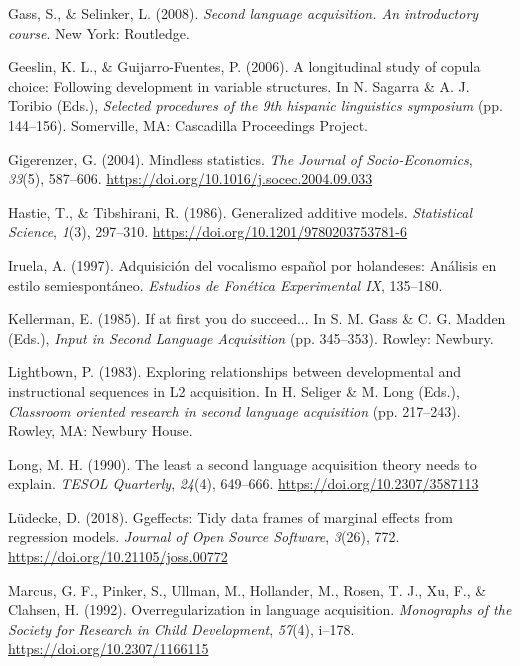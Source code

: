 \documentclass[
  letterpaper,
  DIV=11,
  numbers=noendperiod]{scrartcl}
\newlength{\cslhangindent}
\newenvironment{CSLReferences}[2] %
 {\begin{list}{}{%
  \setlength{\itemindent}{0pt}
  \setlength{\leftmargin}{0pt}
  \setlength{\parsep}{0pt}
  \ifodd #1
   \setlength{\leftmargin}{\cslhangindent}
   \setlength{\itemindent}{-1\cslhangindent}
  \fi
  \setlength{\itemsep}{#2\baselineskip}}}
 {\end{list}}
\begin{document}
\begin{CSLReferences}{1}{0}
Gass, S., \& Selinker, L. (2008). \emph{Second language acquisition. An
introductory course}. New York: Routledge.

Geeslin, K. L., \& Guijarro-Fuentes, P. (2006). A longitudinal study of
copula choice: Following development in variable structures. In N.
Sagarra \& A. J. Toribio (Eds.), \emph{Selected procedures of the 9th
hispanic linguistics symposium} (pp. 144--156). Somerville, MA:
Cascadilla Proceedings Project.

Gigerenzer, G. (2004). Mindless statistics. \emph{The Journal of
Socio-Economics}, \emph{33}(5), 587--606.
\url{https://doi.org/10.1016/j.socec.2004.09.033}

Hastie, T., \& Tibshirani, R. (1986). Generalized additive models.
\emph{Statistical Science}, \emph{1}(3), 297--310.
\url{https://doi.org/10.1201/9780203753781-6}

Iruela, A. (1997). Adquisici{ó}n del vocalismo espa{ñ}ol por holandeses:
An{á}lisis en estilo semiespont{á}neo. \emph{Estudios de Fon{é}tica
Experimental IX}, 135--180.

Kellerman, E. (1985). If at first you do succeed... In S. M. Gass \& C.
G. Madden (Eds.), \emph{Input in {Second Language Acquisition}} (pp.
345--353). Rowley: Newbury.

Lightbown, P. (1983). Exploring relationships between developmental and
instructional sequences in {L}2 acquisition. In H. Seliger \& M. Long
(Eds.), \emph{Classroom oriented research in second language
acquisition} (pp. 217--243). Rowley, MA: Newbury House.

Long, M. H. (1990). The least a second language acquisition theory needs
to explain. \emph{TESOL Quarterly}, \emph{24}(4), 649--666.
\url{https://doi.org/10.2307/3587113}

Lüdecke, D. (2018). Ggeffects: Tidy data frames of marginal effects from
regression models. \emph{Journal of Open Source Software}, \emph{3}(26),
772. \url{https://doi.org/10.21105/joss.00772}

Marcus, G. F., Pinker, S., Ullman, M., Hollander, M., Rosen, T. J., Xu,
F., \& Clahsen, H. (1992). Overregularization in language acquisition.
\emph{Monographs of the Society for Research in Child Development},
\emph{57}(4), i--178. \url{https://doi.org/10.2307/1166115}


\end{CSLReferences}
\end{document}
